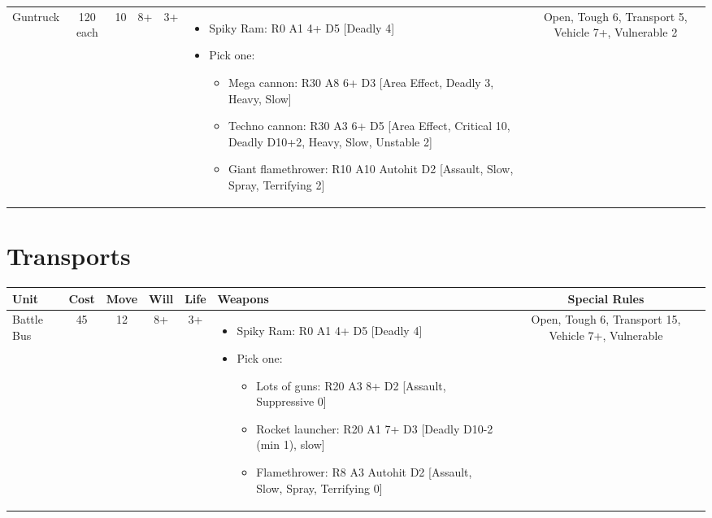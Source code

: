 \documentclass[landscape]{extarticle}
\begin{document}
\begin{small}
\begin{tabular}{UccccWS}
\\


Guntruck
&
120 each
&
10
&
8+
&
3+
&
\begin{itemize}
    \item Spiky Ram: R0 A1 4+ D5 [Deadly 4]
    \item Pick one:
    \begin{itemize}
        \item Mega cannon: R30 A8 6+ D3 [Area Effect, Deadly 3, Heavy, Slow]
        \item Techno cannon: R30 A3 6+ D5 [Area Effect, Critical 10, Deadly D10+2, Heavy, Slow, Unstable 2]
        \item Giant flamethrower: R10 A10 Autohit D2 [Assault, Slow, Spray, Terrifying 2]
    \end{itemize}
\end{itemize}
&
Open, Tough 6, Transport 5, Vehicle 7+, Vulnerable 2
\end{tabular}








\section*{Transports}

\begin{tabular}{UccccWS}

\textbf{Unit} & \textbf{Cost} & \textbf{Move} & \textbf{Will} & \textbf{Life} & \textbf{Weapons} & \textbf{Special Rules} \\


\hline


Battle Bus
&
45
&
12
&
8+
&
3+
&
\begin{itemize}
    \item Spiky Ram: R0 A1 4+ D5 [Deadly 4]
    \item Pick one:
    \begin{itemize}
        \item Lots of guns: R20 A3 8+ D2 [Assault, Suppressive 0]
        \item Rocket launcher: R20 A1 7+ D3 [Deadly D10-2 (min 1), slow]
        \item Flamethrower: R8 A3 Autohit D2 [Assault, Slow, Spray, Terrifying 0]
    \end{itemize}
\end{itemize}
&
Open, Tough 6, Transport 15, Vehicle 7+, Vulnerable
\end{tabular}








\end{small}
\end{document}
